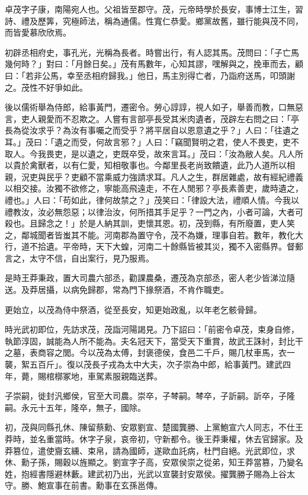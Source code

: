 
\begin{pinyinscope}
卓茂字子康，南陽宛人也。父祖皆至郡守。茂，元帝時學於長安，事博士江生，習詩、禮及歷筭，究極師法，稱為通儒。性寬仁恭愛。鄉黨故舊，雖行能與茂不同，而皆愛慕欣欣焉。

初辟丞相府史，事孔光，光稱為長者。時嘗出行，有人認其馬。茂問曰：「子亡馬幾何時？」對曰：「月餘日矣。」茂有馬數年，心知其謬，嘿解與之，挽車而去，顧曰：「若非公馬，幸至丞相府歸我。」他日，馬主別得亡者，乃詣府送馬，叩頭謝之。茂性不好爭如此。

後以儒術舉為侍郎，給事黃門，遷密令。勞心諄諄，視人如子，舉善而教，口無惡言，吏人親愛而不忍欺之。人嘗有言部亭長受其米肉遺者，茂辟左右問之曰：「亭長為從汝求乎？為汝有事囑之而受乎？將平居自以恩意遺之乎？」人曰：「往遺之耳。」茂曰：「遺之而受，何故言邪？」人曰：「竊聞賢明之君，使人不畏吏，吏不取人。今我畏吏，是以遺之，吏既卒受，故來言耳。」茂曰：「汝為敝人矣。凡人所以貴於禽獸者，以有仁愛，知相敬事也。今鄰里長老尚致饋遺，此乃人道所以相親，況吏與民乎？吏顧不當乘威力強請求耳。凡人之生，群居雜處，故有經紀禮義以相交接。汝獨不欲修之，寧能高飛遠走，不在人閒邪？亭長素善吏，歲時遺之，禮也。」人曰：「苟如此，律何故禁之？」茂笑曰：「律設大法，禮順人情。今我以禮教汝，汝必無怨惡；以律治汝，何所措其手足乎？一門之內，小者可論，大者可殺也。且歸念之！」於是人納其訓，吏懷其恩。初，茂到縣，有所廢置，吏人笑之，鄰城聞者皆蚩其不能。河南郡為置守令，茂不為嫌，理事自若。數年，教化大行，道不拾遺。平帝時，天下大蝗，河南二十餘縣皆被其災，獨不入密縣界。督郵言之，太守不信，自出案行，見乃服焉。

是時王莽秉政，置大司農六部丞，勸課農桑，遷茂為京部丞，密人老少皆涕泣隨送。及莽居攝，以病免歸郡，常為門下掾祭酒，不肯作職吏。

更始立，以茂為侍中祭酒，從至長安，知更始政亂，以年老乞骸骨歸。

時光武初即位，先訪求茂，茂詣河陽謁見。乃下詔曰：「前密令卓茂，束身自修，執節淳固，誠能為人所不能為。夫名冠天下，當受天下重賞，故武王誅紂，封比干之墓，表商容之閭。今以茂為太傅，封褒德侯，食邑二千戶，賜几杖車馬，衣一襲，絮五百斤」。復以茂長子戎為太中大夫，次子崇為中郎，給事黃門。建武四年，薨，賜棺槨冢地，車駕素服親臨送葬。

子崇嗣，徙封汎鄉侯，官至大司農。崇卒，子棽嗣。棽卒，子訢嗣。訢卒，子隆嗣。永元十五年，隆卒，無子，國除。

初，茂與同縣孔休、陳留蔡勳、安眾劉宣、楚國龔勝、上黨鮑宣六人同志，不仕王莽時，並名重當時。休字子泉，哀帝初，守新都令。後王莽秉權，休去官歸家。及莽篡位，遣使齎玄纁、束帛，請為國師，遂歐血託病，杜門自絕。光武即位，求休、勳子孫，賜穀以旌顯之。劉宣字子高，安眾侯崇之從弟，知王莽當篡，乃變名姓，抱經書隱避林藪。建武初乃出，光武以宣襲封安眾侯。擢龔勝子賜為上谷太守。勝、鮑宣事在前書。勳事在玄孫邕傳。


\end{pinyinscope}
